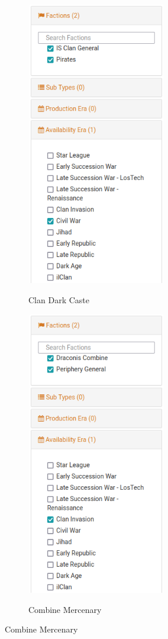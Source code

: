 \begin{figure}[!h]
  \begin{center}
  \begin{subfigure}{0.4\textwidth}
    \centering
    \includegraphics[alt='Clan Dark Caste Faction list', height=4.9in, width=2.4in]{img/Dark-Caste-List.png}
    \caption*{Clan Dark Caste}
  \end{subfigure}
  \hspace{1in}
  \begin{subfigure}{0.4\textwidth}
    \centering
    \includegraphics[alt='Combine Mercenary Faction list', height=4.9in, width=2.4in]{img/Combine-Mercenary-List.png}
    \caption*{Combine Mercenary}
  \end{subfigure}
  \end{center}
\end{figure}
